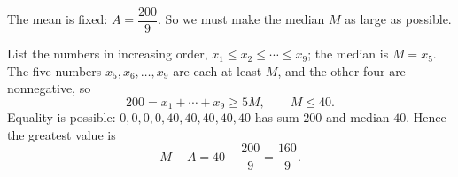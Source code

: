 The mean is fixed: $A=\dfrac{200}{9}$. So we must make the median $M$ as large as possible.

List the numbers in increasing order, $x_1\le x_2\le\cdots\le x_9$; the median is $M=x_5$. The five numbers $x_5,x_6,\dots,x_9$ are each at least $M$, and the other four are nonnegative, so
\[200=x_1+\cdots+x_9\ge5M,\qquad M\le40.\]
Equality is possible: $0,0,0,0,40,40,40,40,40$ has sum $200$ and median $40$. Hence the greatest value is
\[M-A=40-\dfrac{200}{9}=\boxed{\dfrac{160}{9}}.\]
